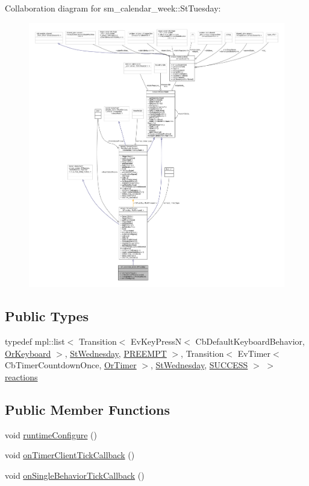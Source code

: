 Collaboration diagram for sm\+\_\+calendar\+\_\+week\+:\+:St\+Tuesday\+:
\nopagebreak
\begin{figure}[H]
\begin{center}
\leavevmode
\includegraphics[width=350pt]{structsm__calendar__week_1_1StTuesday__coll__graph}
\end{center}
\end{figure}
\subsection*{Public Types}
\begin{DoxyCompactItemize}
\item 
typedef mpl\+::list$<$ Transition$<$ Ev\+Key\+PressN$<$ Cb\+Default\+Keyboard\+Behavior, \hyperlink{classsm__calendar__week_1_1OrKeyboard}{Or\+Keyboard} $>$, \hyperlink{structsm__calendar__week_1_1StWednesday}{St\+Wednesday}, \hyperlink{classPREEMPT}{P\+R\+E\+E\+M\+PT} $>$, Transition$<$ Ev\+Timer$<$ Cb\+Timer\+Countdown\+Once, \hyperlink{classsm__calendar__week_1_1OrTimer}{Or\+Timer} $>$, \hyperlink{structsm__calendar__week_1_1StWednesday}{St\+Wednesday}, \hyperlink{classSUCCESS}{S\+U\+C\+C\+E\+SS} $>$ $>$ \hyperlink{structsm__calendar__week_1_1StTuesday_a8761617f08711bc2ba2e3b051c2b5337}{reactions}
\end{DoxyCompactItemize}
\subsection*{Public Member Functions}
\begin{DoxyCompactItemize}
\item 
void \hyperlink{structsm__calendar__week_1_1StTuesday_a1980a60ba5b27efea0cca5746694985f}{runtime\+Configure} ()
\item 
void \hyperlink{structsm__calendar__week_1_1StTuesday_a7d8597c9f4fae517b37147b90c49fb3c}{on\+Timer\+Client\+Tick\+Callback} ()
\item 
void \hyperlink{structsm__calendar__week_1_1StTuesday_ac8fe86e252d56ac6900b521e010aa8c8}{on\+Single\+Behavior\+Tick\+Callback} ()
\end{DoxyCompactItemize}
